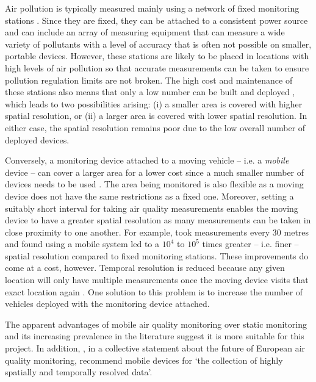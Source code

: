 \documentclass[11pt]{report}
\begin{document}
Air pollution is typically measured mainly using a network of fixed monitoring stations \citep{Adams2012hamilton20052010}. Since they are fixed, they can be attached to a consistent power source and can include an array of measuring equipment that can measure a wide variety of pollutants with a level of accuracy that is often not possible on smaller, portable devices. However, these stations are likely to be placed in locations with high levels of air pollution \citep{Kanaroglou2005location} so that accurate measurements can be taken to ensure pollution regulation limits are not broken. The high cost and maintenance of these stations also means that only a low number can be built and deployed \citep{Devarakonda2013}, which leads to two possibilities arising: (i) a smaller area is covered with higher spatial resolution, or (ii) a larger area is covered with lower spatial resolution. In either case, the spatial resolution remains poor due to the low overall number of deployed devices.

Conversely, a monitoring device attached to a moving vehicle -- i.e. a \textit{mobile} device -- can cover a larger area for a lower cost since a much smaller number of devices needs to be used \citep{Wallace2009mobilehamilton}. The area being monitored is also flexible as a moving device does not have the same restrictions as a fixed one. Moreover, setting a suitably short interval for taking air quality measurements enables the moving device to have a greater spatial resolution as many measurements can be taken in close proximity to one another. For example, \cite{Apte2017googlestreetview} took measurements every 30 metres and found using a mobile system led to a $10^4$ to $10^5$ times greater -- i.e. finer -- spatial resolution compared to fixed monitoring stations. These improvements do come at a cost, however. Temporal resolution is reduced because any given location will only have multiple measurements once the moving device visits that exact location again \citep{Wong2009envmonitoringtemporal}. One solution to this problem is to increase the number of vehicles deployed with the monitoring device attached.

The apparent advantages of mobile air quality monitoring over static monitoring and its increasing prevalence in the literature suggest it is more suitable for this project. In addition, \cite{Kuhlbusch2014futureEUair}, in a collective statement about the future of European air quality monitoring, recommend mobile devices for `the collection of highly spatially and temporally resolved data'.
\end{document}
